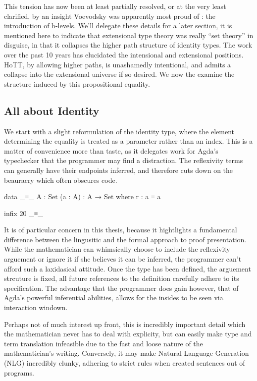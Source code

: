 \documentclass[11pt, a4paper]{article}
\begin{document}
This tension has now been at least partially resolved, or at the very least
clarified, by an insight Voevodsky was apparently most proud of : the
introduction of h-levels. We'll delegate these details for a later section, it
is mentioned here to indicate that extensional type theory was really ``set
theory'' in disguise, in that it collapses the higher path structure of
identity types. The work over the past 10 years has elucidated the intensional
and extensional positions. HoTT, by allowing higher paths, is unashamedly
intentional, and admits a collapse into the extensional universe if so desired.
We now the examine the structure induced by this propositional equality.

\subsection{All about Identity}

We start with a slight reformulation of the identity type, where the element
determining the equality is treated as a parameter rather than an index. This
is a matter of convenience more than taste, as it delegates work for Agda's
typechecker that the programmer may find a distraction. The reflexivity terms
can generally have their endpoints inferred, and therefore cuts down on the
beauracry which often obscures code. 

\begin{code}

  data _≡_ {A : Set} (a : A) : A → Set where
    r : a ≡ a

  infix 20 _≡_

\end{code}

It is of particular concern in this thesis, because it hightlights a
fundamental difference between the lingusitic and the formal approach to proof
presentation.  While the mathematician can whimsically choose to include the
reflexivity arguement or ignore it if she believes it can be inferred, the
programmer can't afford such a laxidasical attitude. Once the type has been
defined, the arguement strcuture is fixed, all future references to the
definition carefully adhere to its specification. The advantage that the
programmer does gain however, that of Agda's powerful inferential abilities,
allows for the insides to be seen via interaction windown. 

Perhaps not of much interest up front, this is incredibly important detail
which the mathematician never has to deal with explicity, but can easily make
type and term translation infeasible due to the fast and loose nature of the
mathematician's writing. Conversely, it may make Natural Language Generation
(NLG) incredibly clunky, adhering to strict rules when created sentences out of
programs. 
\end{document}
